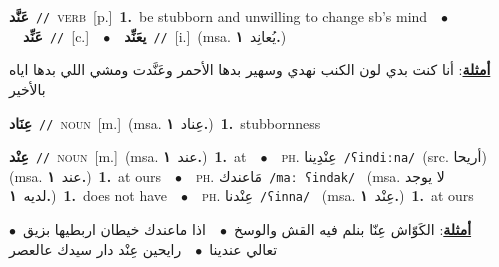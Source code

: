 \documentclass[10pt,a4paper,twoside]{article} %
\begin{document}
\begin{multicols}{2}
{\setlength\topsep{0pt}\textbf{\foreignlanguage{arabic}{عَنَّد}}\ {\color{gray}\texttt{//}\color{black}}\ \textsc{verb}\ [p.]\ \textbf{1.}~be stubborn and unwilling to change sb's mind\ \ $\bullet$\ \ \setlength\topsep{0pt}\textbf{\foreignlanguage{arabic}{عَنِّد}}\ {\color{gray}\texttt{//}\color{black}}\ [c.]\ \ $\bullet$\ \ \setlength\topsep{0pt}\textbf{\foreignlanguage{arabic}{يعَنِّد}}\ {\color{gray}\texttt{//}\color{black}}\ [i.]\ \color{gray}(msa. \foreignlanguage{arabic}{يُعانِد}~\foreignlanguage{arabic}{\textbf{١.}})\color{black}\  \begin{flushright}\color{gray}\foreignlanguage{arabic}{\textbf{\underline{\foreignlanguage{arabic}{أمثلة}}}: أنا كنت بدي لون الكنب نهدي وسهير بدها الأحمر وعَنَّدت ومشي اللي بدها اياه بالأخير}\end{flushright}\color{black}} \vspace{2mm}

{\setlength\topsep{0pt}\textbf{\foreignlanguage{arabic}{عِنَاد}}\ {\color{gray}\texttt{//}\color{black}}\ \textsc{noun}\ [m.]\ \color{gray}(msa. \foreignlanguage{arabic}{عِناد}~\foreignlanguage{arabic}{\textbf{١.}})\color{black}\ \textbf{1.}~stubbornness\ } \vspace{2mm}

{\setlength\topsep{0pt}\textbf{\foreignlanguage{arabic}{عِنْد}}\ {\color{gray}\texttt{//}\color{black}}\ \textsc{noun}\ [m.]\ \color{gray}(msa. \foreignlanguage{arabic}{عند}~\foreignlanguage{arabic}{\textbf{١.}})\color{black}\ \textbf{1.}~at\ \ $\bullet$\ \ \textsc{ph.} \color{gray} \foreignlanguage{arabic}{عِنْدِينا}\color{black}\ {\color{gray}\texttt{/{\sffamily ʕindiːna}/}\color{black}}\ \color{gray}(src. \foreignlanguage{arabic}{أريحا})\color{black}\ \color{gray} (msa. \foreignlanguage{arabic}{عند}~\foreignlanguage{arabic}{\textbf{١.}})\color{black}\ \textbf{1.}~at ours\ \ $\bullet$\ \ \textsc{ph.} \color{gray} \foreignlanguage{arabic}{مَاعندك}\color{black}\ {\color{gray}\texttt{/{\sffamily maː ʕindak}/}\color{black}}\ \color{gray} (msa. \foreignlanguage{arabic}{لا يوجد لديه}~\foreignlanguage{arabic}{\textbf{١.}})\color{black}\ \textbf{1.}~does not have\ \ $\bullet$\ \ \textsc{ph.} \color{gray} \foreignlanguage{arabic}{عِنْدنا}\color{black}\ {\color{gray}\texttt{/{\sffamily ʕinna}/}\color{black}}\ \color{gray} (msa. \foreignlanguage{arabic}{عِنْد}~\foreignlanguage{arabic}{\textbf{١.}})\color{black}\ \textbf{1.}~at ours\  \begin{flushright}\color{gray}\foreignlanguage{arabic}{\textbf{\underline{\foreignlanguage{arabic}{أمثلة}}}: الكَوّاش عِنّا بنلم فيه القش والوسخ\ $\bullet$\ \  اذا ماعندك خيطان اربطيها بزيق\ $\bullet$\ \  تعالي عندينا\ $\bullet$\ \  رايحين عِنْد دار سيدك عالعصر}\end{flushright}\color{black}} \vspace{2mm}


\end{multicols}
\end{document}
